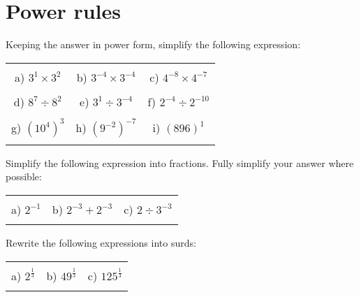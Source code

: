 \documentclass[12pt]{article}
\begin{document}
\section{Power rules}
Keeping the answer in power form, simplify the following expression:
\begin{table}[h!]
\centering
\begin{tabular}{c c c}
\hspace{5cm} & \hspace{5cm} & \hspace{5cm} \\
a) ${3}^{1}\times{3}^{2}$ & b) ${3}^{-4}\times{3}^{-4}$ & c) ${4}^{-8}\times{4}^{-7}$ \\ \\
d) ${8}^{7}\div{8}^{2}$ & e) ${3}^{1}\div{3}^{-4}$ & f) ${2}^{-4}\div{2}^{-10}$ \\ \\
g) $({10}^{4})^{3}$ & h) $({9}^{-2})^{-7}$ & i) $({896})^1$ \\ \\
\end{tabular}
\end{table}
\newline
Simplify the following expression into fractions. Fully simplify your answer where possible:
\begin{table}[h!]
\centering
\begin{tabular}{c c c}
\hspace{5cm} & \hspace{5cm} & \hspace{5cm} \\
a) ${2}^{-1}$ & b) ${2}^{-3} + {2}^{-3}$ & c) ${2}\div{3}^{-3}$ \\ \\
\end{tabular}
\end{table}
\newline
Rewrite the following expressions into surds:
\begin{table}[h!]
\centering
\begin{tabular}{c c c}
\hspace{5cm} & \hspace{5cm} & \hspace{5cm} \\
a) ${2}^\frac{1}{{3}}$ & b) ${49}^\frac{1}{{3}}$ & c) ${125}^\frac{1}{{3}}$ \\ \\
\end{tabular}
\end{table}
\newline
\newpage
\end{document}
